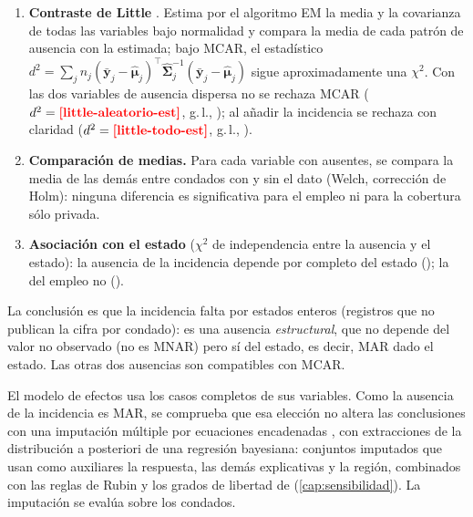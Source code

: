 \begin{enumerate}
  \item \textbf{Contraste de Little} \parencite{little1988}. Estima por el algoritmo EM la media
  y la covarianza de todas las variables bajo normalidad y compara la media de cada patrón de
  ausencia con la estimada; bajo MCAR, el estadístico
  $d^2=\sum_j n_j(\bar{\mathbf y}_j-\hat{\boldsymbol\mu}_j)^{\top}\hat{\boldsymbol\Sigma}_j^{-1}(\bar{\mathbf y}_j-\hat{\boldsymbol\mu}_j)$
  sigue aproximadamente una $\chi^2$. Con las dos variables de ausencia dispersa no se rechaza
  MCAR ($d^2=\res{little-aleatorio-est}$,  g.\,l.,
  ); al añadir la incidencia se rechaza con claridad
  ($d^2=\res{little-todo-est}$,  g.\,l., ).
  \item \textbf{Comparación de medias.} Para cada variable con ausentes, se compara la media de
  las demás entre condados con y sin el dato (Welch, corrección de Holm): ninguna diferencia es
  significativa para el empleo ni para la cobertura sólo privada.
  \item \textbf{Asociación con el estado} ($\chi^2$ de independencia entre la ausencia y el
  estado): la ausencia de la incidencia depende por completo del estado
  (); la del empleo no ().
\end{enumerate}


La conclusión es que la incidencia falta por estados enteros (registros que no publican la
cifra por condado): es una ausencia \emph{estructural}, que no depende del valor no observado
(no es MNAR) pero sí del estado, es decir, MAR dado el estado. Las otras dos ausencias son
compatibles con MCAR.

\begin{idea}
El modelo de efectos usa los casos completos de sus variables. Como la ausencia de la incidencia
es MAR, se comprueba que esa elección no altera las conclusiones con una imputación múltiple por
ecuaciones encadenadas \parencite{vanbuuren2011}, con extracciones de la distribución a
posteriori de una regresión bayesiana:  conjuntos imputados que usan como auxiliares la
respuesta, las demás explicativas y la región, combinados con las reglas de Rubin y los grados de libertad de
\textcite{barnard1999} (\cref{cap:sensibilidad}). La imputación se evalúa sobre los
 condados.
\end{idea}

